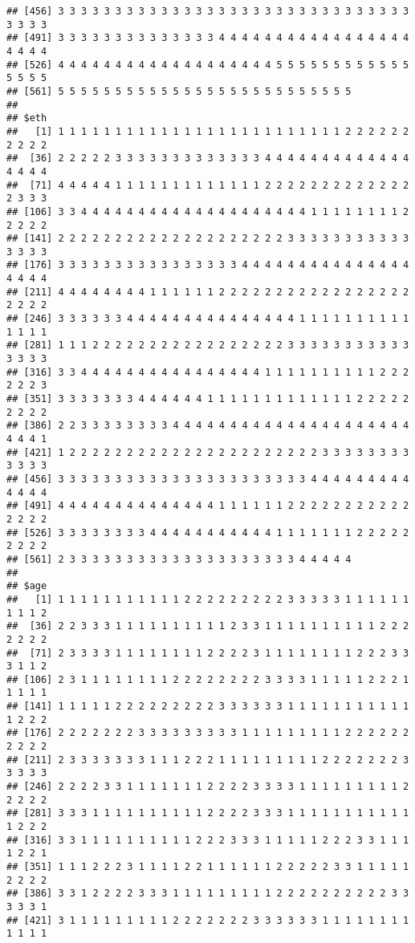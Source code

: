 \documentclass[]{article}
\begin{document}
\begin{verbatim}
## [456] 3 3 3 3 3 3 3 3 3 3 3 3 3 3 3 3 3 3 3 3 3 3 3 3 3 3 3 3 3 3 3 3 3 3 3
## [491] 3 3 3 3 3 3 3 3 3 3 3 3 3 3 4 4 4 4 4 4 4 4 4 4 4 4 4 4 4 4 4 4 4 4 4
## [526] 4 4 4 4 4 4 4 4 4 4 4 4 4 4 4 4 4 4 4 5 5 5 5 5 5 5 5 5 5 5 5 5 5 5 5
## [561] 5 5 5 5 5 5 5 5 5 5 5 5 5 5 5 5 5 5 5 5 5 5 5 5 5 5
## 
## $eth
##   [1] 1 1 1 1 1 1 1 1 1 1 1 1 1 1 1 1 1 1 1 1 1 1 1 1 1 2 2 2 2 2 2 2 2 2 2
##  [36] 2 2 2 2 2 3 3 3 3 3 3 3 3 3 3 3 3 3 4 4 4 4 4 4 4 4 4 4 4 4 4 4 4 4 4
##  [71] 4 4 4 4 4 1 1 1 1 1 1 1 1 1 1 1 1 1 2 2 2 2 2 2 2 2 2 2 2 2 2 2 3 3 3
## [106] 3 3 4 4 4 4 4 4 4 4 4 4 4 4 4 4 4 4 4 4 4 4 1 1 1 1 1 1 1 1 2 2 2 2 2
## [141] 2 2 2 2 2 2 2 2 2 2 2 2 2 2 2 2 2 2 2 2 3 3 3 3 3 3 3 3 3 3 3 3 3 3 3
## [176] 3 3 3 3 3 3 3 3 3 3 3 3 3 3 3 3 4 4 4 4 4 4 4 4 4 4 4 4 4 4 4 4 4 4 4
## [211] 4 4 4 4 4 4 4 4 1 1 1 1 1 1 2 2 2 2 2 2 2 2 2 2 2 2 2 2 2 2 2 2 2 2 2
## [246] 3 3 3 3 3 3 4 4 4 4 4 4 4 4 4 4 4 4 4 4 4 1 1 1 1 1 1 1 1 1 1 1 1 1 1
## [281] 1 1 1 2 2 2 2 2 2 2 2 2 2 2 2 2 2 2 2 2 3 3 3 3 3 3 3 3 3 3 3 3 3 3 3
## [316] 3 3 4 4 4 4 4 4 4 4 4 4 4 4 4 4 4 4 1 1 1 1 1 1 1 1 1 1 2 2 2 2 2 2 3
## [351] 3 3 3 3 3 3 3 4 4 4 4 4 4 1 1 1 1 1 1 1 1 1 1 1 1 1 2 2 2 2 2 2 2 2 2
## [386] 2 2 3 3 3 3 3 3 3 3 4 4 4 4 4 4 4 4 4 4 4 4 4 4 4 4 4 4 4 4 4 4 4 4 1
## [421] 1 2 2 2 2 2 2 2 2 2 2 2 2 2 2 2 2 2 2 2 2 2 2 3 3 3 3 3 3 3 3 3 3 3 3
## [456] 3 3 3 3 3 3 3 3 3 3 3 3 3 3 3 3 3 3 3 3 3 3 4 4 4 4 4 4 4 4 4 4 4 4 4
## [491] 4 4 4 4 4 4 4 4 4 4 4 4 4 4 1 1 1 1 1 1 2 2 2 2 2 2 2 2 2 2 2 2 2 2 2
## [526] 3 3 3 3 3 3 3 3 4 4 4 4 4 4 4 4 4 4 4 1 1 1 1 1 1 1 2 2 2 2 2 2 2 2 2
## [561] 2 3 3 3 3 3 3 3 3 3 3 3 3 3 3 3 3 3 3 3 3 4 4 4 4 4
## 
## $age
##   [1] 1 1 1 1 1 1 1 1 1 1 1 2 2 2 2 2 2 2 2 2 3 3 3 3 3 1 1 1 1 1 1 1 1 1 2
##  [36] 2 2 3 3 3 1 1 1 1 1 1 1 1 1 1 2 3 3 1 1 1 1 1 1 1 1 1 1 2 2 2 2 2 2 2
##  [71] 2 3 3 3 3 1 1 1 1 1 1 1 1 2 2 2 2 3 1 1 1 1 1 1 1 1 2 2 2 3 3 3 1 1 2
## [106] 2 3 1 1 1 1 1 1 1 1 2 2 2 2 2 2 2 2 3 3 3 3 1 1 1 1 1 2 2 2 1 1 1 1 1
## [141] 1 1 1 1 1 2 2 2 2 2 2 2 2 2 3 3 3 3 3 3 1 1 1 1 1 1 1 1 1 1 1 1 2 2 2
## [176] 2 2 2 2 2 2 2 3 3 3 3 3 3 3 3 3 1 1 1 1 1 1 1 1 1 2 2 2 2 2 2 2 2 2 2
## [211] 2 3 3 3 3 3 3 3 1 1 1 2 2 2 1 1 1 1 1 1 1 1 1 2 2 2 2 2 2 2 3 3 3 3 3
## [246] 2 2 2 2 3 3 1 1 1 1 1 1 1 2 2 2 2 3 3 3 3 1 1 1 1 1 1 1 1 1 2 2 2 2 2
## [281] 3 3 3 1 1 1 1 1 1 1 1 1 1 2 2 2 2 3 3 3 1 1 1 1 1 1 1 1 1 1 1 1 2 2 2
## [316] 3 3 1 1 1 1 1 1 1 1 1 1 2 2 2 3 3 3 1 1 1 1 1 2 2 2 3 3 1 1 1 1 2 2 1
## [351] 1 1 1 2 2 2 3 1 1 1 1 2 2 1 1 1 1 1 1 2 2 2 2 2 3 3 1 1 1 1 1 2 2 2 2
## [386] 3 3 1 2 2 2 2 3 3 3 1 1 1 1 1 1 1 1 1 2 2 2 2 2 2 2 2 2 2 3 3 3 3 3 1
## [421] 3 1 1 1 1 1 1 1 1 1 2 2 2 2 2 2 2 3 3 3 3 3 3 1 1 1 1 1 1 1 1 1 1 1 1

\end{verbatim}
\end{document}
